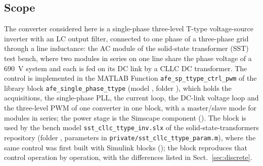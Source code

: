 \documentclass[10pt,a4paper]{scrartcl}
\newcommand{\code}[1]{\texttt{#1}}
\begin{document}

\tableofcontents
\newpage
\begin{onehalfspace}

\section{Scope}
\label{sec:scope}

The converter considered here is a single-phase three-level T-type voltage-source inverter with an LC output filter, connected to one phase of a three-phase grid through a line inductance: the AC module of the solid-state transformer (SST) test bench, where two modules in series on one line share the phase voltage of a \SI{690}{V} system and each is fed on its DC link by a CLLC DC transformer. The control is implemented in the MATLAB Function \code{afe\_sp\_ttype\_ctrl\_pwm} of the library block \code{afe\_single\_phase\_ttype} (model , folder ), which holds the acquisitions, the single-phase PLL, the current loop, the DC-link voltage loop and the three-level PWM of one converter in one block, with a master/slave mode for modules in series; the power stage is the Simscape component  (). The block is used by the bench model \code{sst\_cllc\_ttype\_inv.slx} of the solid-state-transformers repository (folder , parameters in \code{private/sst\_cllc\_ttype\_param.m}), where the same control was first built with Simulink blocks (); the block reproduces that control operation by operation, with the differences listed in Sect.~\ref{sec:discrete}.


\end{onehalfspace}
\end{document}
